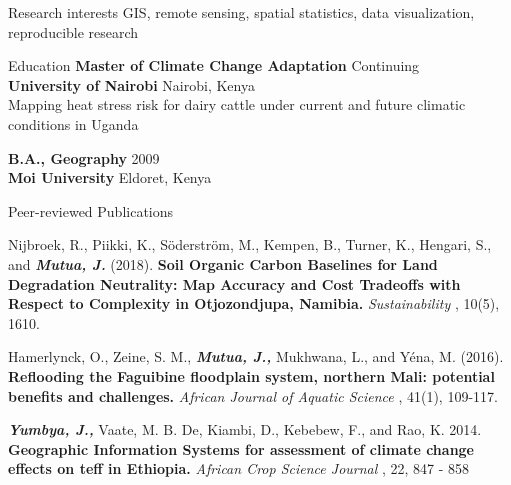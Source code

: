 \documentclass{resume} %
\begin{document}
\begin{rSection}{Research interests}
GIS, remote sensing, spatial statistics, data visualization, reproducible research
\end{rSection}


\begin{rSection}{Education}
{\bf Master of Climate Change Adaptation} \hfill Continuing\\ 
{\bf University of Nairobi} \hfill Nairobi, Kenya \\
{Mapping heat stress risk for dairy cattle under current and future climatic conditions in Uganda} \smallskip 

{\bf B.A., Geography} \hfill  2009 \\
{\bf Moi University} \hfill Eldoret, Kenya\smallskip 
\end{rSection}


\begin{rSection}{Peer-reviewed Publications}

Nijbroek, R., Piikki, K., S\"oderstr\"om, M., Kempen, B., Turner, K., Hengari, S., and {\bf \em{Mutua, J.}} (2018). { \bf Soil Organic Carbon Baselines for Land Degradation Neutrality: Map Accuracy and Cost Tradeoffs with Respect to Complexity in Otjozondjupa, Namibia. } {\em Sustainability }, 10(5), 1610.

Hamerlynck, O., Zeine, S. M., {\bf \em{Mutua, J.,}} Mukhwana, L., and Y\'ena, M. (2016). { \bf Reflooding the Faguibine floodplain system, northern Mali: potential benefits and challenges. } {\em African Journal of Aquatic Science }, 41(1), 109-117.

{\bf \em{Yumbya, J.,}} Vaate, M. B. De, Kiambi, D., Kebebew, F., and Rao, K. 2014. { \bf Geographic Information Systems for assessment of climate change effects on teff in Ethiopia. } {\em African Crop Science Journal }, 22, 847 - 858

\end{rSection}

\end{document}
